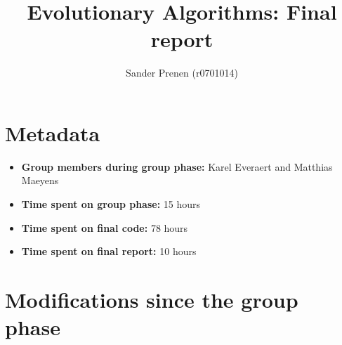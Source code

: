 \documentclass[a4paper,10pt]{article}
\title{Evolutionary Algorithms: Final report}
\author{Sander Prenen (r0701014)}
\newcommand{\nextyear}{\advance\year by 1 \the\year\advance\year by -1}
\newcommand{\deadlineReport}{January 4, \nextyear{} at 16:00 CET}
\newcommand{\ReplaceMe}[1]{{\color{blue}#1}}
\newcommand{\RemoveMe}[1]{{\color{purple}#1}}
\begin{document}
\selectfont{}

\maketitle





\section{Metadata}

\begin{itemize}
 \item \textbf{Group members during group phase:} Karel Everaert and Matthias Maeyens
 \item \textbf{Time spent on group phase:} 15 hours
 \item \textbf{Time spent on final code:} 78 hours
 \item \textbf{Time spent on final report:} \ReplaceMe{10 hours}
\end{itemize}

\section{Modifications since the group phase}
\end{document}
